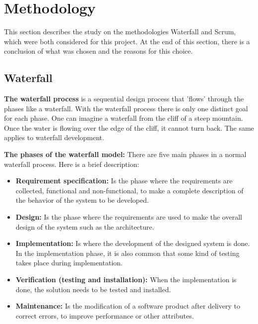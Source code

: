 \section{Methodology}
\label{sec:premethodology}

This section describes the study on the methodologies Waterfall and Scrum, which were both considered 
for this project. At the end of this section, there is a conclusion of what was chosen and the reasons for this choice.

\subsection{Waterfall}

{\bf The waterfall process } \cite{wikiWaterfall, techtargetWaterfall} is a sequential design process that 'flows' through the phases like a waterfall.
With the waterfall process there is only one distinct goal for each phase. One can imagine a waterfall from the cliff of a steep mountain. Once the water is flowing over the edge of the cliff, it cannot turn back. The same applies to waterfall development. 

{\bf The phases of the waterfall model:} There are five main phases in a normal waterfall process. 
Here is a brief description:
\begin{itemize}
	\item {\bf Requirement specification:} Is the phase where the requirements are collected, functional and non-functional, to make a complete description of the behavior of the system to be developed.
	\item {\bf Design: } Is the phase where the requirements are used to make the overall design of the system such as the
	architecture.
	\item {\bf Implementation:} Is where the development of the designed system is done. In the implementation phase, 
	it is also common that some kind of testing takes place during implementation.
	\item {\bf Verification (testing and installation): } When the implementation is done, the solution needs to be tested and installed.
	\item {\bf Maintenance:} Is the modification of a software product after delivery to correct errors, to improve performance or other attributes.
\end{itemize}

